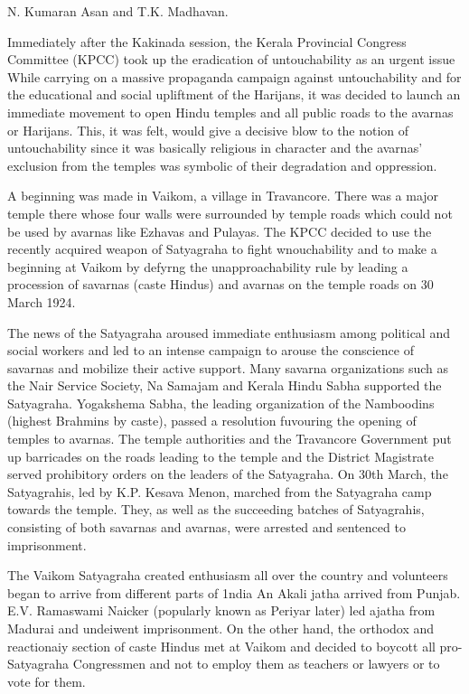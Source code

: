N. Kumaran Asan and T.K. Madhavan.

Immediately after the Kakinada session, the Kerala Provincial Congress Committee (KPCC) took up the eradication of untouchability as an urgent issue While carrying on a massive propaganda campaign against untouchability and for the educational and social upliftment of the Harijans, it was decided to launch an immediate movement to open Hindu temples and all public roads to the avarnas or Harijans. This, it was felt, would give a decisive blow to the notion of untouchability since it was basically religious in character and the avarnas’ exclusion from the temples was symbolic of their degradation and oppression.

A beginning was made in Vaikom, a village in Travancore. There was a major temple there whose four walls were surrounded by temple roads which could not be used by avarnas like Ezhavas and Pulayas. The KPCC decided to use the recently acquired weapon of Satyagraha to fight wnouchability and to make a beginning at Vaikom by defyrng the unapproachability rule by leading a procession of savarnas (caste Hindus) and avarnas on the temple roads on 30 March 1924.

The news of the Satyagraha aroused immediate enthusiasm among political and social workers and led to an intense campaign to arouse the conscience of savarnas and mobilize their active support. Many savarna organizations such as the Nair Service Society, Na Samajam and Kerala Hindu Sabha supported the Satyagraha. Yogakshema Sabha, the leading organization of the Namboodins (highest Brahmins by caste), passed a resolution fuvouring the opening of temples to avarnas. The temple authorities and the Travancore Government put up barricades on the roads leading to the temple and the District Magistrate served prohibitory orders on the leaders of the Satyagraha. On 30th March, the Satyagrahis, led by K.P. Kesava Menon, marched from the Satyagraha camp towards the temple. They, as well as the succeeding batches of Satyagrahis, consisting of both savarnas and avarnas, were arrested and sentenced to imprisonment.

The Vaikom Satyagraha created enthusiasm all over the country and volunteers began to arrive from different parts of 1ndia An Akali jatha arrived from Punjab. E.V. Ramaswami Naicker (popularly known as Periyar later) led ajatha from Madurai and undeiwent imprisonment. On the other hand, the orthodox and reactionaiy section of caste Hindus met at Vaikom and decided to boycott all pro-Satyagraha Congressmen and not to employ them as teachers or lawyers or to vote for them.

